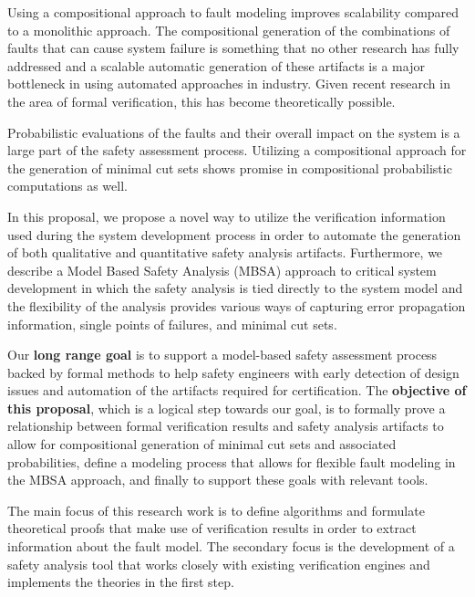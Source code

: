 Using a compositional approach to fault modeling improves scalability compared to a monolithic approach. The compositional generation of the combinations of faults that can cause system failure is something that no other research has fully addressed and a scalable automatic generation of these artifacts is a major bottleneck in using automated approaches in industry. Given recent research in the area of formal verification, this has become theoretically possible.

Probabilistic evaluations of the faults and their overall impact on the system is a large part of the safety assessment process. Utilizing a compositional approach for the generation of minimal cut sets shows promise in compositional probabilistic computations as well. %

In this proposal, we propose a novel way to utilize the verification information used during the system development process in order to automate the generation of both qualitative and quantitative safety analysis artifacts. Furthermore, we describe a Model Based Safety Analysis (MBSA) approach to critical system development in which the safety analysis is tied directly to the system model and the flexibility of the analysis provides various ways of capturing error propagation information, single points of failures, and minimal cut sets.

Our \textbf{long range goal} is to support a model-based safety assessment process backed by formal methods to help safety engineers with early detection of design issues and automation of the artifacts required for certification. The \textbf{objective of this proposal}, which is a logical step towards our goal, is to formally prove a relationship between formal verification results and safety analysis artifacts to allow for compositional generation of minimal cut sets and associated probabilities, define a modeling process that allows for flexible fault modeling in the MBSA approach, and finally to support these goals with relevant tools.

The main focus of this research work is to define algorithms and formulate theoretical proofs that make use of verification results in order to extract information about the fault model. The secondary focus is the development of a safety analysis tool that works closely with existing verification engines and implements the theories in the first step.

